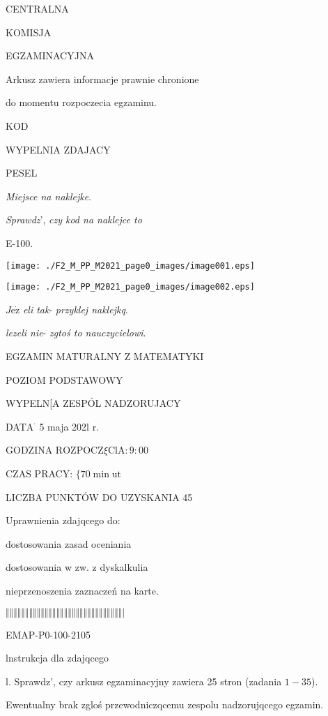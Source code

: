 \documentclass[a4paper,12pt]{article}
\begin{document}
CENTRALNA

KOMISJA

EGZAMINACYJNA

Arkusz zawiera informacje prawnie chronione

do momentu rozpoczecia egzaminu.

KOD

WYPELNIA ZDAJACY

PESEL

{\it Miejsce na naklejke}.

{\it Sprawdz}', {\it czy kod na naklejce to}

E-100.
\begin{center}
\texttt{[image: ./F2\_M\_PP\_M2021\_page0\_images/image001.eps]}

\texttt{[image: ./F2\_M\_PP\_M2021\_page0\_images/image002.eps]}
\end{center}
$J\mathrm{e}\dot{\mathrm{z}}$ {\it eli tak}- {\it przyklej naklejkq}.

{\it lezeli nie}- {\it zgtoś to nauczycielowi}.

EGZAMIN MATURALNY Z MATEMATYKI

POZIOM PODSTAWOWY

WYPELN[A ZESPÓL NADZORUJACY

DAT$\mathrm{A}^{\cdot}$ 5 maja 202l $\mathrm{r}.$

GODZINA $\mathrm{R}\mathrm{O}\mathrm{Z}\mathrm{P}\mathrm{O}\mathrm{C}\mathrm{Z}\xi \mathrm{C}\mathrm{l}\mathrm{A}:9:00$

CZAS PRACY: $\{70 \displaystyle \min \mathrm{u}\mathrm{t}$

LICZBA PUNKTÓW DO UZYSKANIA 45

Uprawnienia zdajqcego do:

\fbox{} dostosowania zasad oceniania

\fbox{} dostosowania w zw. z dyskalkulia

\fbox{} nieprzenoszenia zaznaczeń na karte.

$\Vert\Vert\Vert\Vert\Vert\Vert\Vert\Vert\Vert\Vert\Vert\Vert\Vert\Vert\Vert\Vert\Vert\Vert\Vert\Vert\Vert\Vert\Vert\Vert\Vert\Vert\Vert\Vert\Vert\Vert|$

EMAP-P0-100-2105

lnstrukcja dla zdajqcego

l. Sprawdz', czy arkusz egzaminacyjny zawiera 25 stron (zadania $1-35$).

Ewentualny brak zgloś przewodniczqcemu zespolu nadzorujqcego egzamin.
\end{document}

